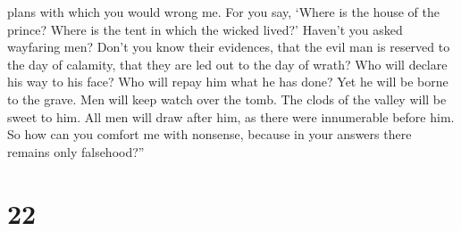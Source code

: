 plans with which you would wrong me.  For you say, `Where
is the house of the prince? Where is the tent in which the wicked
lived?'  Haven't you asked wayfaring men? Don't you know
their evidences,  that the evil man is reserved to the day
of calamity, that they are led out to the day of wrath? 
Who will declare his way to his face? Who will repay him what he has
done?  Yet he will be borne to the grave. Men will keep
watch over the tomb.  The clods of the valley will be sweet
to him. All men will draw after him, as there were innumerable before
him.  So how can you comfort me with nonsense, because in
your answers there remains only falsehood?''

\hypertarget{section-13}{%
\section{22}\label{section-13}}

